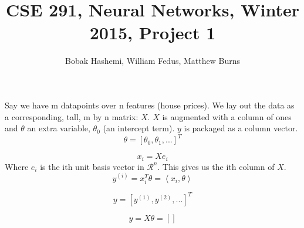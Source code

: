 \documentclass[12pt]{article}
\title{CSE 291, Neural Networks, Winter 2015, Project 1}
\author{Bobak Hashemi, William Fedus, Matthew Burns}
\begin{document}
\maketitle

Say we have m datapoints over n features (house prices). We lay out the data as a corresponding, tall, m by n matrix: $X$. $X$ is augmented with a column of ones and $\theta$ an extra variable, $\theta_0$ (an intercept term). $y$ is packaged as a column vector.\\    

\begin{equation}
\theta = [\theta_{0},\theta_{1}, ...]^{T}
\end{equation}

\begin{equation}
x_{i}= Xe_{i} 
\end{equation}
Where $e_i$ is the ith unit basis vector in $\mathcal{R}^n$. This gives us the ith column of $X$.\\

\begin{equation}
y^{(i)}=x_{i}^{T}\theta = \left \langle x_{i}, \theta \right \rangle 
\end{equation}

\begin{equation}
y = [y^{(1)},y^{(2)},...]^{T}
\end{equation}

\begin{equation}
y=X\theta=[]
\end{equation}
\end{document}

